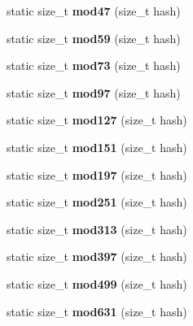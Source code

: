 \begin{DoxyCompactItemize}
\item 
static size\+\_\+t {\bfseries mod47} (size\+\_\+t hash)\label{structska_1_1prime__number__hash__policy_aea326c7d1dce5ca6271796776fb2c0ac}

\item 
static size\+\_\+t {\bfseries mod59} (size\+\_\+t hash)\label{structska_1_1prime__number__hash__policy_a4c0d0b3e4cf664e2492eb4cd66e060fb}

\item 
static size\+\_\+t {\bfseries mod73} (size\+\_\+t hash)\label{structska_1_1prime__number__hash__policy_acd79944e2ed6ec749b3059755ad105a8}

\item 
static size\+\_\+t {\bfseries mod97} (size\+\_\+t hash)\label{structska_1_1prime__number__hash__policy_ac39ce7b1a7e3fc5faa9db2b3940c27b5}

\item 
static size\+\_\+t {\bfseries mod127} (size\+\_\+t hash)\label{structska_1_1prime__number__hash__policy_af02a9e99adbcecbd1dc21d776a23271a}

\item 
static size\+\_\+t {\bfseries mod151} (size\+\_\+t hash)\label{structska_1_1prime__number__hash__policy_a9bd8959a8c34db811e9dab2bdacade3b}

\item 
static size\+\_\+t {\bfseries mod197} (size\+\_\+t hash)\label{structska_1_1prime__number__hash__policy_a1133c263f46f835ea5733995bafcf727}

\item 
static size\+\_\+t {\bfseries mod251} (size\+\_\+t hash)\label{structska_1_1prime__number__hash__policy_a01b39c17298f1d3f5e263067a522a14d}

\item 
static size\+\_\+t {\bfseries mod313} (size\+\_\+t hash)\label{structska_1_1prime__number__hash__policy_ab5ad132597c13594b9e1d5ecc8199cd4}

\item 
static size\+\_\+t {\bfseries mod397} (size\+\_\+t hash)\label{structska_1_1prime__number__hash__policy_a5c6cf8584148db70ffae94bfccf9700e}

\item 
static size\+\_\+t {\bfseries mod499} (size\+\_\+t hash)\label{structska_1_1prime__number__hash__policy_af8fde6c342c10b0648d0869540fe0993}

\item 
static size\+\_\+t {\bfseries mod631} (size\+\_\+t hash)\label{structska_1_1prime__number__hash__policy_a325a81b54e2b9355d3a94397f9d492f8}


\end{DoxyCompactItemize}
